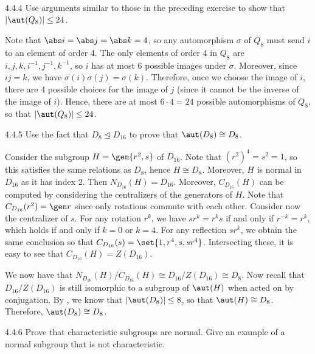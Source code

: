 \begin{exercise}{4.4.4}
	Use arguments similar to those in the preceding exercise to show that $|\aut(Q_8)| \le 24$.
\end{exercise}

\begin{sol}
	Note that $\abs i = \abs j = \abs k = 4$, so any automorphism $\sigma$ of $Q_8$ must send $i$ to an element of order 4.
	The only elements of order 4 in $Q_8$ are $i, j, k, i^{-1}, j^{-1}, k^{-1}$, so $i$ has at most 6 possible images under $\sigma$.
	Moreover, since $ij = k$, we have $\sigma(i)\sigma(j) = \sigma(k)$.
	Therefore, once we choose the image of $i$, there are 4 possible choices for the image of $j$ (since it cannot be the inverse of the image of $i$).
	Hence, there are at most $6 \cdot 4 = 24$ possible automorphisms of $Q_8$, so that $|\aut(Q_8)| \leq 24$.
\end{sol}

\begin{exercise}{4.4.5}
	Use the fact that $D_8 \trianglelefteq D_{16}$ to prove that $\aut(D_8) \cong D_8$.
\end{exercise}

\begin{sol}
	Consider the subgroup $H = \gen{r^2, s}$ of $D_{16}$.
	Note that $(r^2)^4 = s^2 = 1$, so this satisfies the same relations as $D_8$, hence $H \cong D_8$.
	Moreover, $H$ is normal in $D_{16}$ as it has index 2.
	Then $N_{D_{16}}(H) = D_{16}$.
	Moreover, $C_{D_{16}}(H)$ can be computed by considering the centralizers of the generators of $H$.
	Note that $C_{D_{16}}(r^2) = \gen r$ since only rotations commute with each other.
	Consider now the centralizer of $s$.
	For any rotation $r^k$, we have $sr^k = r^ks$ if and only if $r^{-k} = r^k$, which holds if and only if $k = 0$ or $k = 4$.
	For any reflection $sr^k$, we obtain the same conclusion so that $C_{D_{16}}(s) = \set{1, r^4, s, sr^4}$.
	Intersecting these, it is easy to see that $C_{D_{16}}(H) = Z(D_{16})$.

	We now have that $N_{D_{16}}(H)/C_{D_{16}}(H) \cong D_{16}/Z(D_{16}) \cong D_8$.
	Now recall that $D_{16}/Z(D_{16})$ is still isomorphic to a subgroup of $\aut(H)$ when acted on by conjugation.
	By , we know that $|\aut(D_8)| \leq 8$, so that $\aut(H) \cong D_8$.
	Therefore, $\aut(D_8) \cong D_8$.
\end{sol}

\begin{exercise}{4.4.6}
	Prove that characteristic subgroups are normal.
	Give an example of a normal subgroup that is not characteristic.
\end{exercise}

